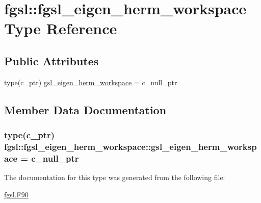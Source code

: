 \hypertarget{structfgsl_1_1fgsl__eigen__herm__workspace}{}\section{fgsl\+:\+:fgsl\+\_\+eigen\+\_\+herm\+\_\+workspace Type Reference}
\label{structfgsl_1_1fgsl__eigen__herm__workspace}
\subsection*{Public Attributes}
\begin{DoxyCompactItemize}
\item 
type(c\+\_\+ptr) \hyperlink{structfgsl_1_1fgsl__eigen__herm__workspace_a7f78768ae373ecc0557037dda210b843}{gsl\+\_\+eigen\+\_\+herm\+\_\+workspace} = c\+\_\+null\+\_\+ptr
\end{DoxyCompactItemize}


\subsection{Member Data Documentation}
\hypertarget{structfgsl_1_1fgsl__eigen__herm__workspace_a7f78768ae373ecc0557037dda210b843}{}
\subsubsection[{gsl\+\_\+eigen\+\_\+herm\+\_\+workspace}]{\setlength{\rightskip}{0pt plus 5cm}type(c\+\_\+ptr) fgsl\+::fgsl\+\_\+eigen\+\_\+herm\+\_\+workspace\+::gsl\+\_\+eigen\+\_\+herm\+\_\+workspace = c\+\_\+null\+\_\+ptr}\label{structfgsl_1_1fgsl__eigen__herm__workspace_a7f78768ae373ecc0557037dda210b843}


The documentation for this type was generated from the following file\+:\begin{DoxyCompactItemize}
\item 
\hyperlink{fgsl_8F90}{fgsl.\+F90}\end{DoxyCompactItemize}
